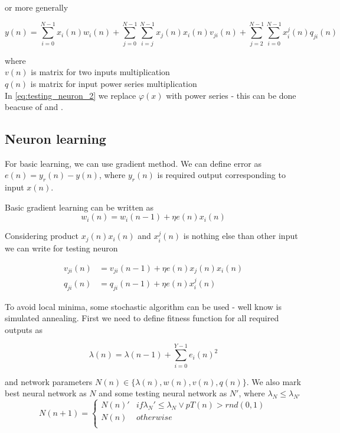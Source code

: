\documentclass[times]{cpeauth}
\begin{document}
or more generally

\begin{equation}
\label{eq:testing_neuron_2}
  y(n) = \sum_{i = 0}^{N-1} x_i(n)w_i(n) + \sum_{j = 0}^{N-1} \sum_{i = j}^{N-1} x_j(n)x_i(n)v_{ji}(n) +  \sum_{j = 2}^{N-1} \sum_{i = 0}^{N-1} x_i^j(n)q_{ji}(n)
\end{equation}

where \\
$v(n)$ is matrix for two inputs multiplication \\
$q(n)$ is matrix for input power series multiplication \\

In \ref{eq:testing_neuron_2} we replace $\varphi(x)$ with power series
- this can be done beacuse of \cite{bib:taylor_01} and \cite{bib:taylor_02}.


\subsection{Neuron learning}

For basic learning, we can use gradient method.
We can define error as $e(n) = y_r(n) - y(n)$, where $y_r(n)$ is required output corresponding
to input $x(n)$.

Basic gradient learning can be written as
\begin{equation}
\label{eq:neuron_learning_1}
  w_i(n) =  w_i(n-1) + \eta e(n)x_i(n)
\end{equation}

Considering product $x_j(n)x_i(n)$ and $x_i^j(n)$ is nothing else than other input we can write for testing neuron

\begin{align}
\label{eq:neuron_learning_1}
  v_{ji}(n) &=  v_{ji}(n-1) + \eta e(n)x_j(n)x_i(n) \\
  q_{ji}(n) &=  q_{ji}(n-1) + \eta e(n)x_i^j(n)
\end{align}

To avoid local minima, some stochastic algorithm can be used - well know is simulated annealing.
First we need to define fitness function for all required outputs as

\begin{equation}
\label{eq:fitness}
  \lambda(n) = \lambda(n-1) + \sum_{i = 0}^{Y-1} e_i(n)^2
\end{equation}

and network parameters $N(n) \in \{\lambda(n), w(n), v(n), q(n)\}$.
We also mark best neural network as $N$ and some testing neural network as $N'$,
where $\lambda_N \leq \lambda_{N'}$
\begin{equation}
 N(n+1) =
  \begin{cases}
    N(n)' &  if \lambda_N' \le \lambda_{N} \lor pT(n) > rnd(0, 1)\\
    N(n)  &  otherwise\\
  \end{cases}
\end{equation}
\end{document}
